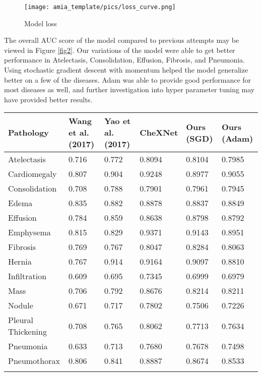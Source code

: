\documentclass{amia}
\begin{document}
\begin{figure}[h!]
\centering
\texttt{[image: amia\_template/pics/loss\_curve.png]}
\caption{Model loss}
\label{fig1}
\end{figure}

The overall AUC score of the model compared to previous attempts may be viewed in Figure \ref{fig2}. Our variations of the model were able to get better performance in Atelectasis, Consolidation, Effusion, Fibrosis, and Pneumonia. Using stochastic gradient descent with momentum helped the model generalize better on a few of the diseases. Adam was able to provide good performance for most diseases as well, and further investigation into hyper parameter tuning may have provided better results.

\begin{center}
\begin{tabular}{p{3cm}|p{2cm}|p{2cm}|p{2cm}|p{2cm}|p{2cm}}
Pathology          & Wang et al. (2017) & Yao et al. (2017) & CheXNet & Ours (SGD) & Ours (Adam) \\
\midrule
Atelectasis        & 0.716              & 0.772             & 0.8094  & 0.8104     & 0.7985      \\
Cardiomegaly       & 0.807              & 0.904             & 0.9248  & 0.8977     & 0.9055      \\
Consolidation      & 0.708              & 0.788             & 0.7901  & 0.7961     & 0.7945      \\
Edema              & 0.835              & 0.882             & 0.8878  & 0.8837     & 0.8849      \\
Effusion           & 0.784              & 0.859             & 0.8638  & 0.8798     & 0.8792      \\
Emphysema          & 0.815              & 0.829             & 0.9371  & 0.9143     & 0.8951      \\
Fibrosis           & 0.769              & 0.767             & 0.8047  & 0.8284     & 0.8063      \\
Hernia             & 0.767              & 0.914             & 0.9164  & 0.9097     & 0.8810      \\
Infiltration       & 0.609              & 0.695             & 0.7345  & 0.6999     & 0.6979      \\
Mass               & 0.706              & 0.792             & 0.8676  & 0.8214     & 0.8211      \\
Nodule             & 0.671              & 0.717             & 0.7802  & 0.7506     & 0.7226      \\
Pleural Thickening & 0.708              & 0.765             & 0.8062  & 0.7713     & 0.7634      \\
Pneumonia          & 0.633              & 0.713             & 0.7680  & 0.7678     & 0.7498      \\
Pneumothorax       & 0.806              & 0.841             & 0.8887  & 0.8674     & 0.8533      \\
\label{fig2}
\end{tabular}
\end{center}
\end{document}
